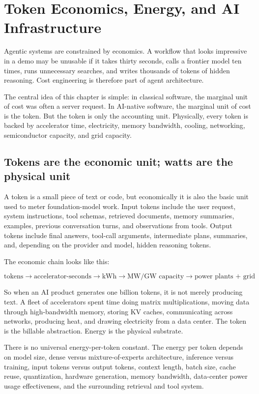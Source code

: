 \chapter{Token Economics, Energy, and AI Infrastructure}

Agentic systems are constrained by economics. A workflow that looks impressive in a demo may be unusable if it takes thirty seconds, calls a frontier model ten times, runs unnecessary searches, and writes thousands of tokens of hidden reasoning. Cost engineering is therefore part of agent architecture.

The central idea of this chapter is simple: in classical software, the marginal unit of cost was often a server request. In AI-native software, the marginal unit of cost is the token. But the token is only the accounting unit. Physically, every token is backed by accelerator time, electricity, memory bandwidth, cooling, networking, semiconductor capacity, and grid capacity.

\section{Tokens are the economic unit; watts are the physical unit}

A token is a small piece of text or code, but economically it is also the basic unit used to meter foundation-model work. Input tokens include the user request, system instructions, tool schemas, retrieved documents, memory summaries, examples, previous conversation turns, and observations from tools. Output tokens include final answers, tool-call arguments, intermediate plans, summaries, and, depending on the provider and model, hidden reasoning tokens.

The economic chain looks like this:

\[
\text{tokens} \rightarrow \text{accelerator-seconds} \rightarrow \text{kWh} \rightarrow \text{MW/GW capacity} \rightarrow \text{power plants + grid}
\]

So when an AI product generates one billion tokens, it is not merely producing text. A fleet of accelerators spent time doing matrix multiplications, moving data through high-bandwidth memory, storing KV caches, communicating across networks, producing heat, and drawing electricity from a data center. The token is the billable abstraction. Energy is the physical substrate.

There is no universal energy-per-token constant. The energy per token depends on model size, dense versus mixture-of-experts architecture, inference versus training, input tokens versus output tokens, context length, batch size, cache reuse, quantization, hardware generation, memory bandwidth, data-center power usage effectiveness, and the surrounding retrieval and tool system.

